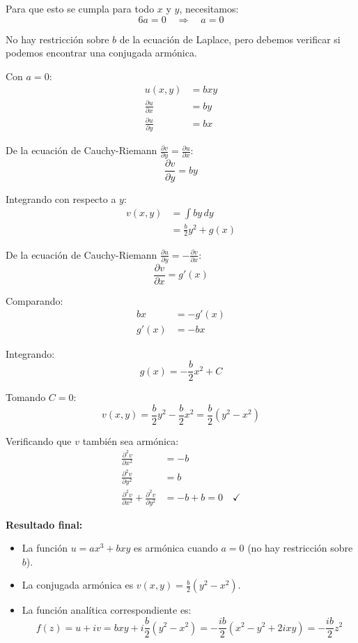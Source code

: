 \documentclass{article}
\begin{document}
Para que esto se cumpla para todo $x$ y $y$, necesitamos:
$$6a = 0 \quad \Rightarrow \quad a = 0$$

No hay restricción sobre $b$ de la ecuación de Laplace, pero debemos verificar si podemos encontrar una conjugada armónica.

Con $a = 0$:
\begin{align*}
u(x,y) &= bxy \\
\frac{\partial u}{\partial x} &= by \\
\frac{\partial u}{\partial y} &= bx
\end{align*}

De la ecuación de Cauchy-Riemann $\frac{\partial v}{\partial y} = \frac{\partial u}{\partial x}$:
$$\frac{\partial v}{\partial y} = by$$

Integrando con respecto a $y$:
\begin{align*}
v(x,y) &= \int by \, dy \\
       &= \frac{b}{2}y^2 + g(x)
\end{align*}

De la ecuación de Cauchy-Riemann $\frac{\partial u}{\partial y} = -\frac{\partial v}{\partial x}$:
$$\frac{\partial v}{\partial x} = g'(x)$$

Comparando:
\begin{align*}
bx &= -g'(x) \\
g'(x) &= -bx
\end{align*}

Integrando:
$$g(x) = -\frac{b}{2}x^2 + C$$

Tomando $C = 0$:
$$v(x,y) = \frac{b}{2}y^2 - \frac{b}{2}x^2 = \frac{b}{2}(y^2 - x^2)$$

Verificando que $v$ también sea armónica:
\begin{align*}
\frac{\partial^2 v}{\partial x^2} &= -b \\
\frac{\partial^2 v}{\partial y^2} &= b \\
\frac{\partial^2 v}{\partial x^2} + \frac{\partial^2 v}{\partial y^2} &= -b + b = 0 \quad \checkmark
\end{align*}

\textbf{Resultado final:}
\begin{itemize}
\item La función $u = ax^3 + bxy$ es armónica cuando $a = 0$ (no hay restricción sobre $b$).
\item La conjugada armónica es $v(x,y) = \frac{b}{2}(y^2 - x^2)$.
\item La función analítica correspondiente es:
$$f(z) = u + iv = bxy + i\frac{b}{2}(y^2 - x^2) = -\frac{ib}{2}(x^2 - y^2 + 2ixy) = -\frac{ib}{2}z^2$$
\end{itemize}
\end{document}
